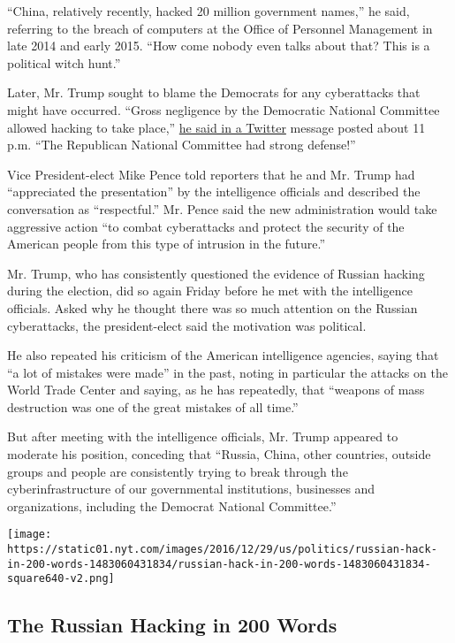 ``China, relatively recently, hacked 20 million government names,'' he
said, referring to the breach of computers at the Office of Personnel
Management in late 2014 and early 2015. ``How come nobody even talks
about that? This is a political witch hunt.''

Later, Mr. Trump sought to blame the Democrats for any cyberattacks that
might have occurred. ``Gross negligence by the Democratic National
Committee allowed hacking to take place,''
\href{https://twitter.com/realDonaldTrump/status/817579925771341825}{he
said in a Twitter} message posted about 11 p.m. ``The Republican
National Committee had strong defense!''

Vice President-elect Mike Pence told reporters that he and Mr. Trump had
``appreciated the presentation'' by the intelligence officials and
described the conversation as ``respectful.'' Mr. Pence said the new
administration would take aggressive action ``to combat cyberattacks and
protect the security of the American people from this type of intrusion
in the future.''

Mr. Trump, who has consistently questioned the evidence of Russian
hacking during the election, did so again Friday before he met with the
intelligence officials. Asked why he thought there was so much attention
on the Russian cyberattacks, the president-elect said the motivation was
political.

He also repeated his criticism of the American intelligence agencies,
saying that ``a lot of mistakes were made'' in the past, noting in
particular the attacks on the World Trade Center and saying, as he has
repeatedly, that ``weapons of mass destruction was one of the great
mistakes of all time.''

But after meeting with the intelligence officials, Mr. Trump appeared to
moderate his position, conceding that ``Russia, China, other countries,
outside groups and people are consistently trying to break through the
cyberinfrastructure of our governmental institutions, businesses and
organizations, including the Democrat National Committee.''

\href{https://www.nytimes.com/interactive/2016/12/29/us/politics/russian-hack-in-200-words.html}{}

\texttt{[image: https://static01.nyt.com/images/2016/12/29/us/politics/russian-hack-in-200-words-1483060431834/russian-hack-in-200-words-1483060431834-square640-v2.png]}

\hypertarget{the-russian-hacking-in-200-words}{%
\subsection{The Russian Hacking in 200
Words}\label{the-russian-hacking-in-200-words}}

